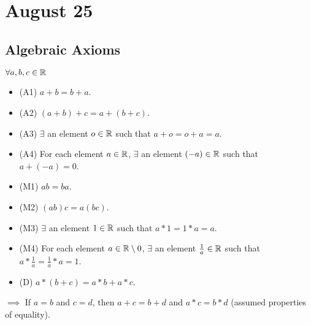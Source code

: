 \section{August 25}
\subsection{Algebraic Axioms} $\forall a, b, c \in \mathbb{R}$
\begin{itemize}
    \item (A1) $a + b = b + a$.
    \item (A2) $(a + b) + c = a + (b + c)$.
    \item (A3) $\exists$ an element $o \in \mathbb{R}$ such that $a + o = o + a = a$.
    \item (A4) For each element $a \in \mathbb{R}$, $\exists$ an element $(-a) \in \mathbb{R}$ such that $a + (-a) = 0$.
    \item (M1) $ab = ba$.
    \item (M2) $(ab)c = a(bc)$.
    \item (M3) $\exists$ an element $1 \in \mathbb{R}$ such that $a * 1 = 1 * a = a$.
    \item (M4) For each element $a \in \mathbb{R} \setminus {0}$, $\exists$ an element $\frac{1}{a} \in \mathbb{R}$ such that $a * \frac{1}{a} = \frac{1}{a} * a = 1$.
    \item (D) $a * (b + c) = a * b + a * c$.
\end{itemize}
$\implies$ If $a = b$ and $c = d$, then $a + c = b + d$ and $a * c = b * d$ (assumed properties of equality).

